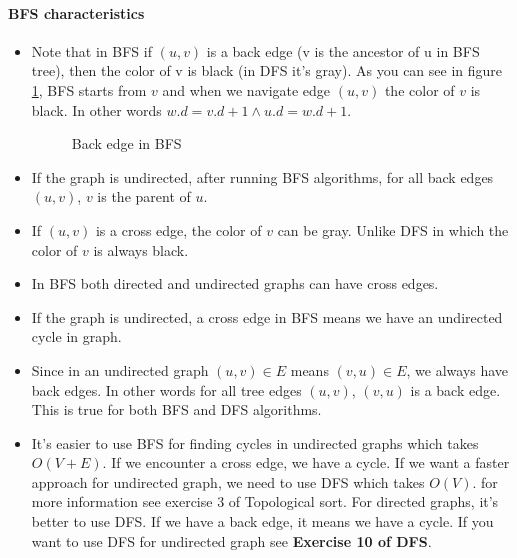 \documentclass{book}
\begin{document}
	\label{psec:BFScharacteristics}
	\paragraph{BFS characteristics}
	\begin{itemize}
		\item Note that in BFS if $(u, v)$ is a back edge (v is the ancestor of u in BFS tree), then the color of v is black (in DFS it's gray). As you can see in figure \ref{fig:BackEdgeInBfs}, BFS starts from $v$ and when we navigate edge $(u, v)$ the color of $v$ is black. In other words $w.d = v.d + 1 \land u.d = w.d + 1$.
		
		\begin{figure}[h!]
			\centering
			\caption{Back edge in BFS}
			\label{fig:BackEdgeInBfs}
		\end{figure}
		\FloatBarrier

		\item If the graph is undirected, after running BFS algorithms, for all back edges $(u, v)$, $v$ is the parent of $u$.				
		\item If $(u, v)$ is a cross edge, the color of $v$ can be gray. Unlike DFS in which the color of $v$ is always black.
		
		\item In BFS both directed and undirected graphs can have cross edges.
		
		\item If the graph is undirected, a cross edge in BFS means we have an undirected cycle in graph.
		
		\item Since in an undirected graph $(u, v) \in E$ means $(v, u) \in E$, we always have back edges. In other words for all tree edges $(u, v)$, $(v, u)$ is a back edge. This is true for both BFS and DFS algorithms.
		
		\item It's easier to use BFS for finding cycles in undirected graphs which takes $O(V + E)$. If we encounter a cross edge, we have a cycle. If we want a faster approach for undirected graph, we need to use DFS which takes $O(V)$. for more information see exercise 3 of Topological sort. For directed graphs, it's better to use DFS. If we have a back edge, it means we have a cycle. If you want to use DFS for undirected graph see \textbf{Exercise 10 of DFS}.
	 
	\end{itemize}
\end{document}
